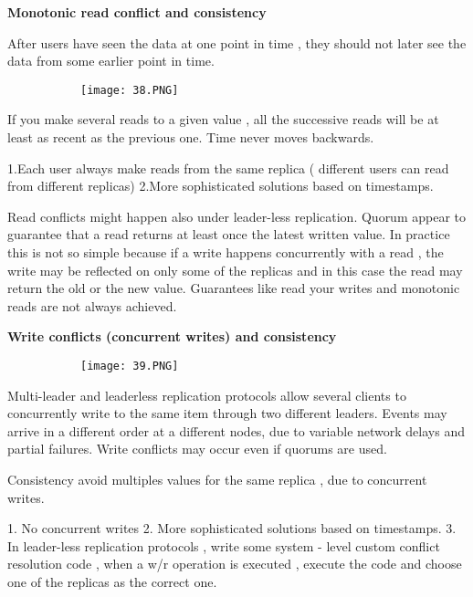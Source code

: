 \documentclass{article}
\begin{document}
\vspace{3mm}
\textbf{Monotonic read conflict and consistency}

After users have seen the data at one point in time , they should not later see the data from some earlier point in time.


\begin{figure}[ht!]
  \centering
  \begin{subfigure}[b]{0.25\linewidth}
    \texttt{[image: 38.PNG]}
  \end{subfigure}
\end{figure}

If you make several reads to a given value , all the successive reads will be at least as recent as the previous one. Time never moves backwards.

1.Each user always make reads from the same replica ( different users can read from different replicas)
2.More sophisticated solutions based on timestamps.

\vspace{3mm}

Read conflicts might happen also under leader-less replication. Quorum appear to guarantee that a read returns at least once the latest written value. In practice this is not so simple because if a write happens concurrently with a read , the write may be reflected on only some of the replicas and in this case the read may return the old or the new value.
Guarantees like read your writes and monotonic reads are not always achieved.


\vspace{3mm}
\textbf{Write conflicts (concurrent writes) and consistency}


\begin{figure}[ht!]
  \centering
  \begin{subfigure}[b]{0.25\linewidth}
    \texttt{[image: 39.PNG]}
  \end{subfigure}
\end{figure}

Multi-leader and leaderless replication protocols allow several clients to concurrently write to the same item through two different leaders. Events may arrive in a different order at a different nodes, due to variable network delays and partial failures. Write conflicts may occur even if quorums are used. 

Consistency avoid multiples values for the same replica , due to concurrent writes.

1. No concurrent writes
2. More sophisticated solutions based on timestamps.
3. In leader-less replication protocols , write some system - level custom conflict resolution code ,  when a w/r operation is executed , execute the code and choose one of the replicas as the correct one.
\end{document}
